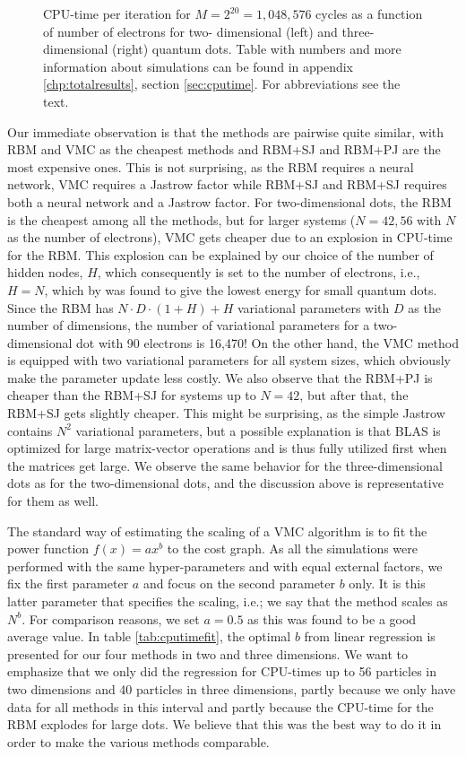 \begin{figure}
	\centering 
	
	\caption{CPU-time per iteration for $M=2^{20}=1,048,576$ cycles as a function of number of electrons for two- dimensional (left) and three-dimensional (right) quantum dots. Table with numbers and more information about simulations can be found in appendix \ref{chp:totalresults}, section \ref{sec:cputime}. For abbreviations see the text.}
	\label{fig:cpu_time}
\end{figure} 

Our immediate observation is that the methods are pairwise quite similar, with RBM and VMC as the cheapest methods and RBM+SJ and RBM+PJ are the most expensive ones. This is not surprising, as the RBM requires a neural network, VMC requires a Jastrow factor while RBM+SJ and RBM+SJ requires both a neural network and a Jastrow factor. For two-dimensional dots, the RBM is the cheapest among all the methods, but for larger systems ($N=42,56$ with $N$ as the number of electrons), VMC gets cheaper due to an explosion in CPU-time for the RBM. This explosion can be explained by our choice of the number of hidden nodes, $H$, which consequently is set to the number of electrons, i.e., $H=N$, which by \citet{nordhagen_computational_2018} was found to give the lowest energy for small quantum dots. Since the RBM has $N\cdot D\cdot (1+H)+H$ variational parameters with $D$ as the number of dimensions, the number of variational parameters for a two-dimensional dot with 90 electrons is 16,470! On the other hand, the VMC method is equipped with two variational parameters for all system sizes, which obviously make the parameter update less costly. We also observe that the RBM+PJ is cheaper than the RBM+SJ for systems up to $N=42$, but after that, the RBM+SJ gets slightly cheaper. This might be surprising, as the simple Jastrow contains $N^2$ variational parameters, but a possible explanation is that BLAS is optimized for large matrix-vector operations and is thus fully utilized first when the matrices get large. We observe the same behavior for the three-dimensional dots as for the two-dimensional dots, and the discussion above is representative for them as well.

The standard way of estimating the scaling of a VMC algorithm is to fit the power function $f(x)=ax^b$ to the cost graph. As all the simulations were performed with the same hyper-parameters and with equal external factors, we fix the first parameter $a$ and focus on the second parameter $b$ only. It is this latter parameter that specifies the scaling, i.e.; we say that the method scales as $N^b$. For comparison reasons, we set $a=0.5$ as this was found to be a good average value. In table \eqref{tab:cputimefit}, the optimal $b$ from linear regression is presented for our four methods in two and three dimensions. We want to emphasize that we only did the regression for CPU-times up to 56 particles in two dimensions and 40 particles in three dimensions, partly because we only have data for all methods in this interval and partly because the CPU-time for the RBM explodes for large dots. We believe that this was the best way to do it in order to make the various methods comparable. 

